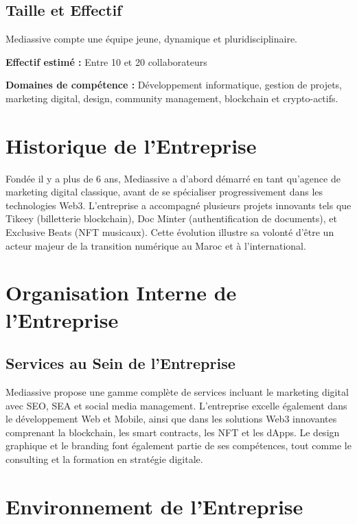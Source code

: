 \subsection{Taille et Effectif}

Mediassive compte une équipe jeune, dynamique et pluridisciplinaire.

\textbf{Effectif estimé :} Entre 10 et 20 collaborateurs

\textbf{Domaines de compétence :} Développement informatique, gestion de projets, marketing digital, design, community management, blockchain et crypto-actifs.

\section{Historique de l'Entreprise}

Fondée il y a plus de 6 ans, Mediassive a d'abord démarré en tant qu'agence de marketing digital classique, avant de se spécialiser progressivement dans les technologies Web3. L'entreprise a accompagné plusieurs projets innovants tels que Tikeey (billetterie blockchain), Doc Minter (authentification de documents), et Exclusive Beats (NFT musicaux). Cette évolution illustre sa volonté d'être un acteur majeur de la transition numérique au Maroc et à l'international.

\section{Organisation Interne de l'Entreprise}


\subsection{Services au Sein de l'Entreprise}

Mediassive propose une gamme complète de services incluant le marketing digital avec SEO, SEA et social media management. L'entreprise excelle également dans le développement Web et Mobile, ainsi que dans les solutions Web3 innovantes comprenant la blockchain, les smart contracts, les NFT et les dApps. Le design graphique et le branding font également partie de ses compétences, tout comme le consulting et la formation en stratégie digitale.

\section{Environnement de l'Entreprise}

